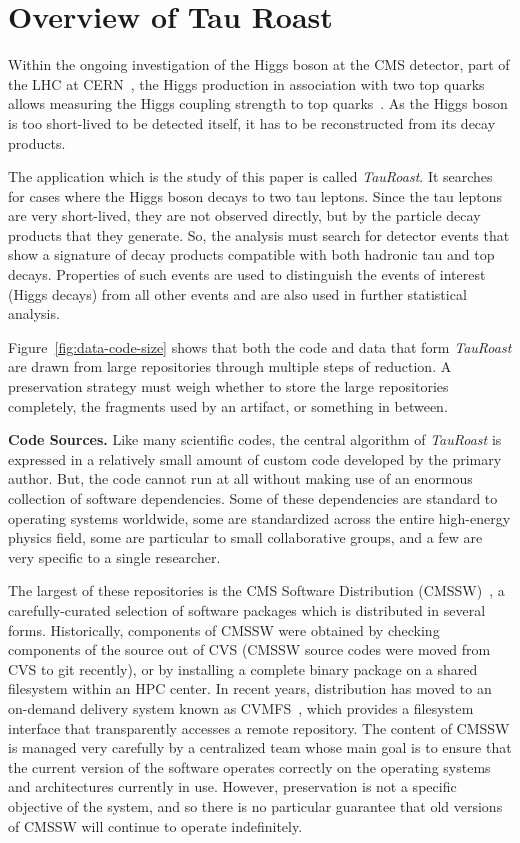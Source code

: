 \documentclass[procedia]{easychair}
\begin{document}
\section{Overview of Tau Roast}

Within the ongoing investigation of the Higgs boson at the CMS
detector, part of the LHC at CERN~\cite{collaboration2008cms}, the Higgs production in association
with two top quarks allows measuring the Higgs coupling strength to
top quarks~\cite{chatrchyan2013search}.  As the Higgs boson is too short-lived to be detected
itself, it has to be reconstructed from its decay products.

The application which is the study of this paper is called \emph{TauRoast}.
It searches for cases where the Higgs boson decays to two tau leptons.
Since the tau leptons are very short-lived, they are not observed directly, but by the particle decay products 
that they generate.  So, the analysis must search for detector
events that show a signature of decay products compatible with both hadronic tau and top decays.  Properties of such events are used to distinguish
the events of interest (Higgs decays) from all other events and
are also used in further statistical analysis.

Figure~\ref{fig:data-code-size} shows that both the code and data
that form \emph{TauRoast} are drawn from large repositories through
multiple steps of reduction.  A preservation strategy must weigh
whether to store the large repositories completely, the fragments
used by an artifact, or something in between.

{\bf Code Sources.} Like many scientific codes, the central algorithm
of \emph{TauRoast} is expressed in a relatively small amount of
custom code developed by the primary author.  But, the code cannot
run at all without making use of an enormous collection of software
dependencies.  Some of these dependencies are standard to operating
systems worldwide, some are standardized across the entire high-energy
physics field, some are particular to small collaborative groups,
and a few are very specific to a single researcher.

The largest of these repositories is the CMS Software Distribution (CMSSW)~\cite{cms2006cms},
a carefully-curated selection of software packages which is distributed
in several forms.  Historically, components of CMSSW were obtained by checking components
of the source out of CVS (CMSSW source codes were moved from CVS to git recently), or by installing a complete binary package on a shared
filesystem within an HPC center.  In recent years, distribution has moved to
an on-demand delivery system known as CVMFS~\cite{blomer2011cernvm}, which
provides a filesystem interface that transparently accesses a remote repository.
The content of CMSSW is managed very carefully by a centralized team whose main goal
is to ensure that the current version of the software operates correctly
on the operating systems and architectures currently in use.  However,
preservation is not a specific objective of the system, and so there is
no particular guarantee that old versions of CMSSW will continue to
operate indefinitely.
\end{document}
